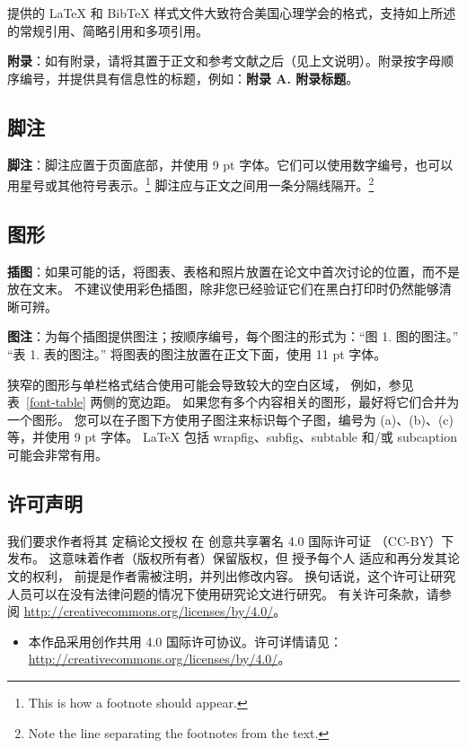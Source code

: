\documentclass[11pt]{article}
\begin{document}
\begin{CJK*}{UTF8}{gbsn}
提供的 \LaTeX{} 和 Bib\TeX{} 样式文件大致符合美国心理学会的格式，支持如上所述的常规引用、简略引用和多项引用。

{\bf 附录}：如有附录，请将其置于正文和参考文献之后（见上文说明）。附录按字母顺序编号，并提供具有信息性的标题，例如：{\bf 附录 A. 附录标题}。
\subsection{脚注}

{\bf 脚注}：脚注应置于页面底部，并使用 9 pt 字体。它们可以使用数字编号，也可以用星号或其他符号表示。\footnote{This is how a footnote should appear.} 脚注应与正文之间用一条分隔线隔开。\footnote{Note the line separating the footnotes from the text.}
\subsection{图形}

{\bf 插图}：如果可能的话，将图表、表格和照片放置在论文中首次讨论的位置，而不是放在文末。
不建议使用彩色插图，除非您已经验证它们在黑白打印时仍然能够清晰可辨。

{\bf 图注}：为每个插图提供图注；按顺序编号，每个图注的形式为：“图 1. 图的图注。” “表 1. 表的图注。” 将图表的图注放置在正文下面，使用 11 pt 字体。

狭窄的图形与单栏格式结合使用可能会导致较大的空白区域， 
例如，参见表~\ref{font-table} 两侧的宽边距。
如果您有多个内容相关的图形，最好将它们合并为一个图形。
您可以在子图下方使用子图注来标识每个子图，编号为 (a)、(b)、(c) 等，并使用 9 pt 字体。
\LaTeX{} 包括 wrapfig、subfig、subtable 和/或 subcaption 可能会非常有用。
\subsection{许可声明}
\label{licence}

我们要求作者将其
定稿论文授权
在
创意共享署名 4.0 国际许可证
（CC-BY）下发布。
这意味着作者（版权所有者）保留版权，但
授予每个人
适应和再分发其论文的权利，
前提是作者需被注明，并列出修改内容。
换句话说，这个许可让研究人员可以在没有法律问题的情况下使用研究论文进行研究。
有关许可条款，请参阅
\url{http://creativecommons.org/licenses/by/4.0/}。

\begin{itemize}
    \item 本作品采用创作共用 4.0 国际许可协议。许可详情请见：\url{http://creativecommons.org/licenses/by/4.0/}。

\end{itemize}


\end{CJK*}
\end{document}
